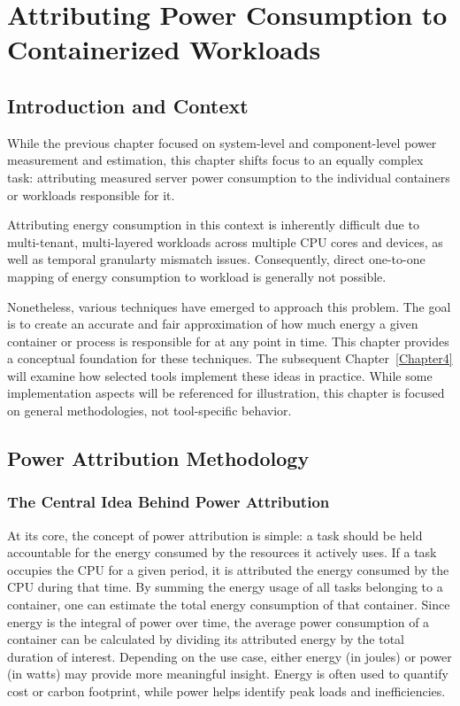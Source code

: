 \chapter{Attributing Power Consumption to Containerized Workloads} %
\label{Chapter3}

\section{Introduction and Context}

While the previous chapter focused on system-level and component-level power measurement and estimation, this chapter shifts focus to an equally complex task: attributing measured server power consumption to the individual containers or workloads responsible for it.

Attributing energy consumption in this context is inherently difficult due to  multi-tenant, multi-layered workloads across multiple CPU cores and devices, as well as temporal granularty mismatch issues. Consequently, direct one-to-one mapping of energy consumption to workload is generally not possible.

Nonetheless, various techniques have emerged to approach this problem. The goal is to create an accurate and fair approximation of how much energy a given container or process is responsible for at any point in time. This chapter provides a conceptual foundation for these techniques. The subsequent Chapter~\ref{Chapter4} will examine how selected tools implement these ideas in practice. While some implementation aspects will be referenced for illustration, this chapter is focused on general methodologies, not tool-specific behavior.

\section{Power Attribution Methodology}

\subsection{The Central Idea Behind Power Attribution}

At its core, the concept of power attribution is simple: a task should be held accountable for the energy consumed by the resources it actively uses. If a task occupies the CPU for a given period, it is attributed the energy consumed by the CPU during that time. By summing the energy usage of all tasks belonging to a container, one can estimate the total energy consumption of that container. Since energy is the integral of power over time, the average power consumption of a container can be calculated by dividing its attributed energy by the total duration of interest. Depending on the use case, either energy (in joules) or power (in watts) may provide more meaningful insight. Energy is often used to quantify cost or carbon footprint, while power helps identify peak loads and inefficiencies.

